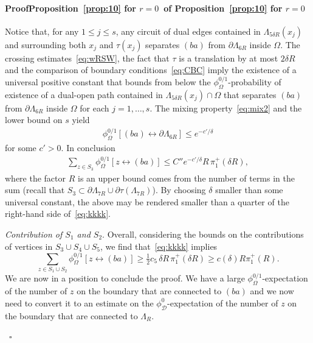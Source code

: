 \documentclass[a4paper,oneside,11pt]{article}
\numberwithin{equation}{section}
\numberwithin{equation}{section}
\numberwithin{equation}{section}
\newenvironment{proof}[1][\relax]%
  {\paragraph{Proof\ifx#1\relax\else~of #1\fi}}%
  {~\hfill$\square$\par\bigskip}
\newcommand{\calD}{\mathcal{D}}
\newcommand{\La}{\Lambda}
\begin{document}
\begin{proof}[Proposition~\ref{prop:10} for $r=0$]
Notice that, for any $1 \leq j \leq s$, any circuit of dual edges contained in $\La_{5\delta R }(x_j)$ and surrounding both $x_j$ and $\tau(x_j)$ separates $(ba)$ from $\partial \La_{6R}$ inside $\Omega$. 
The crossing estimates~\eqref{eq:wRSW}, the fact that $\tau$ is a translation by at most $2\delta R$ and the comparison of boundary conditions~\eqref{eq:CBC} imply the existence of a universal positive constant 
that bounds from below the $\phi^{0/1}_\Omega$-probability of existence of a dual-open path contained in $\La_{5\delta R }(x_j) \cap \Omega$ that 
separates $(ba)$ from $\partial \La_{6R}$ inside $\Omega$ for each $j = 1,\dots, s$. 
The mixing property~\eqref{eq:mix2} and the lower bound on $s$ yield 
\begin{align*}
	\phi^{0/1}_\Omega[(ba)\longleftrightarrow\partial\Lambda_{6R}]
	\leq e^{-c'/\delta}
\end{align*}
for some $c' > 0$. 
In conclusion 
\begin{align*}
	\sum_{z  \in S_3}	\phi^{0/1}_\Omega[z\longleftrightarrow (ba)]
	\le C'' e^{-c'/\delta} R \,\pi_1^+(\delta R),
\end{align*}
where the factor $R$ is an upper bound comes from the number of terms in the sum (recall that $S_3 \subset \partial \La_{7R} \cup \partial \tau(\La_{7R})$).
By choosing $\delta$ smaller than some universal constant, the above may be rendered smaller than a quarter of the right-hand side of~\eqref{eq:kkkk}.




\bigbreak\noindent
{\em Contribution  of $S_1$ and $S_2$}.
Overall, considering the bounds on the contributions of vertices in $S_3\cup S_4\cup S_5$, we find that~\eqref{eq:kkkk} implies
\begin{equation}\label{eq:k5}
	\sum_{z\in S_1 \cup S_2}\phi^{0/1}_\Omega[z\longleftrightarrow (ba)]
	\geq \tfrac12 c_5\, \delta R \, \pi_1^+(\delta R)\ge c(\delta) R\pi_1^+(R).
\end{equation}
\bigbreak
We are now in a position to conclude the proof. We have a large $\phi^{0/1}_\Omega$-expectation of the number of $z$ on the boundary that are connected to $(ba)$ and we now need to convert it to an estimate on the $\phi^0_\calD$-expectation of the number of $z$ on the boundary that are connected to $\Lambda_R$.


\end{proof}
\end{document}
